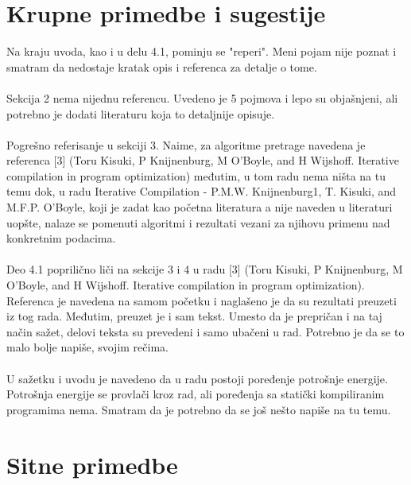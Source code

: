 \documentclass[a4paper]{report}
\begin{document}
\section{Krupne primedbe i sugestije}

\label{sec: primedbe}

\noindent Na kraju uvoda, kao i u delu 4.1, pominju se "reperi". Meni pojam nije poznat i smatram da nedostaje kratak opis i referenca za detalje o tome.
\\
\\
Sekcija 2 nema nijednu referencu. Uvedeno je 5 pojmova i lepo su objašnjeni, ali potrebno je dodati literaturu koja to detaljnije opisuje.
\\
\\
Pogrešno referisanje u sekciji 3. Naime, za algoritme pretrage navedena je referenca [3] (Toru Kisuki, P Knijnenburg, M O'Boyle, and H Wijshoff. Iterative compilation in program optimization) međutim, u tom radu nema ništa na tu temu dok, u radu Iterative Compilation - P.M.W. Knijnenburg1, T. Kisuki, and M.F.P. O'Boyle, koji je zadat kao početna literatura a nije naveden u literaturi uopšte, nalaze se pomenuti algoritmi i rezultati vezani za njihovu primenu nad konkretnim podacima.
\\
\\
Deo 4.1 poprilično liči na sekcije 3 i 4 u radu  [3] (Toru Kisuki, P Knijnenburg, M O'Boyle, and H Wijshoff. Iterative compilation in program optimization). Referenca je navedena na samom početku i naglašeno je da su rezultati preuzeti iz tog rada. Međutim, preuzet je i sam tekst. Umesto da je prepričan i na taj način sažet, delovi teksta su prevedeni i samo ubačeni u rad. Potrebno je da se to malo bolje napiše, svojim rečima.
\\
\\
U sažetku i uvodu je navedeno da u radu postoji poređenje potrošnje energije. Potrošnja energije se provlači kroz rad, ali poređenja sa statički kompiliranim programima nema. Smatram da je potrebno da se još nešto napiše na tu temu.

\section{Sitne primedbe}
\end{document}
